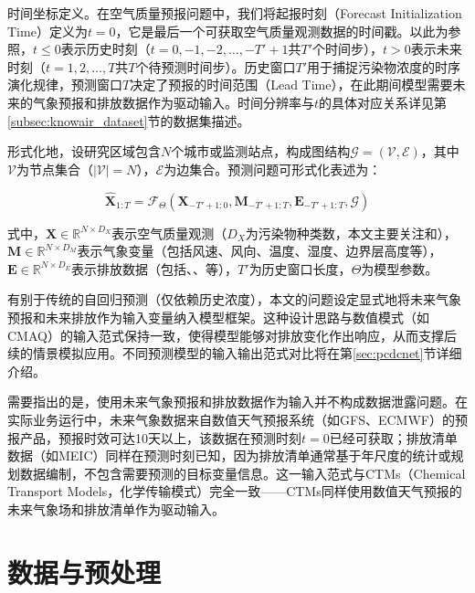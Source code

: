 时间坐标定义。在空气质量预报问题中，我们将起报时刻（Forecast Initialization Time）定义为$t=0$，它是最后一个可获取空气质量观测数据的时间戳。以此为参照，$t \leq 0$表示历史时刻（$t=0, -1, -2, \ldots, -T'+1$共$T'$个时间步），$t>0$表示未来时刻（$t=1, 2, \ldots, T$共$T$个待预测时间步）。历史窗口$T'$用于捕捉污染物浓度的时序演化规律，预测窗口$T$决定了预报的时间范围（Lead Time），在此期间模型需要未来的气象预报和排放数据作为驱动输入。时间分辨率与$t$的具体对应关系详见第\ref{subsec:knowair_dataset}节的数据集描述。

形式化地，设研究区域包含$N$个城市或监测站点，构成图结构$\mathcal{G} = (\mathcal{V}, \mathcal{E})$，其中$\mathcal{V}$为节点集合（$|\mathcal{V}|=N$），$\mathcal{E}$为边集合。预测问题可形式化表述为：

\begin{equation}
\hat{\mathbf{X}}_{1:T} = \mathcal{F}_\Theta\left(\mathbf{X}_{-T'+1:0}, \mathbf{M}_{-T'+1:T}, \mathbf{E}_{-T'+1:T}, \mathcal{G} \right)
\label{eq:pred_problem}
\end{equation}

\noindent 式中，$\mathbf{X} \in \mathbb{R}^{N \times D_X}$表示空气质量观测（$D_X$为污染物种类数，本文主要关注\PM 和\ozone），$\mathbf{M} \in \mathbb{R}^{N \times D_M}$表示气象变量（包括风速、风向、温度、湿度、边界层高度等），$\mathbf{E} \in \mathbb{R}^{N \times D_E}$表示排放数据（包括\NOx、\VOCs、\SOtwo 等），$T'$为历史窗口长度，$\Theta$为模型参数。

有别于传统的自回归预测（仅依赖历史浓度），本文的问题设定显式地将未来气象预报和未来排放作为输入变量纳入模型框架。这种设计思路与数值模式（如CMAQ）的输入范式保持一致，使得模型能够对排放变化作出响应，从而支撑后续的情景模拟应用。不同预测模型的输入输出范式对比将在第\ref{sec:pcdcnet}节详细介绍。

需要指出的是，使用未来气象预报和排放数据作为输入并不构成数据泄露问题。在实际业务运行中，未来气象数据来自数值天气预报系统（如GFS、ECMWF）的预报产品，预报时效可达10天以上，该数据在预测时刻$t=0$已经可获取；排放清单数据（如MEIC）同样在预测时刻已知，因为排放清单通常基于年尺度的统计或规划数据编制，不包含需要预测的目标变量信息。这一输入范式与CTMs（Chemical Transport Models，化学传输模式）完全一致——CTMs同样使用数值天气预报的未来气象场和排放清单作为驱动输入。


\section{数据与预处理}
\label{sec:pred_data}

